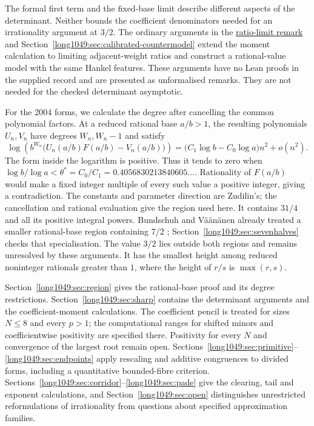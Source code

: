 \documentclass[11pt]{article}
\begin{document}
The formal first term and the fixed-base limit describe different
aspects of the determinant. Neither bounds the coefficient
denominators needed for an irrationality argument at $3/2$. The ordinary arguments in
the \hyperref[long1049:thm:geometric-ratio]{ratio-limit remark} and
Section~\ref{long1049:sec:calibrated-countermodel} extend the moment
calculation to limiting adjacent-weight ratios and construct a
rational-value model with the same Hankel features. These arguments
have no Lean proofs in the supplied record and are presented as
unformalised remarks. They are not needed for the checked determinant
asymptotic.

For the 2004 forms, we calculate the degree after cancelling the
common polynomial factors. At a reduced rational base $a/b>1$,
the resulting polynomials $U_n,V_n$ have degrees $W_n,W_n-1$ and
satisfy
\[
 \log\!\left(b^{W_n}\bigl(U_n(a/b)F(a/b)-V_n(a/b)\bigr)\right)
 =\bigl(C_1\log b-C_0\log a\bigr)n^2+o(n^2).
\]
The form inside the logarithm is positive. Thus it tends to zero
when $\log b/\log a<\theta^*=C_0/C_1
=0.4056830213840605\ldots$. Rationality of $F(a/b)$ would make a
fixed integer multiple of every such value a positive integer,
giving a contradiction. The constants and parameter direction are
Zudilin's; the cancellation and rational evaluation give the region
used here. It contains $31/4$ and all its positive integral powers.
Bundschuh and V\"a\"an\"anen already treated a smaller rational-base
region containing $7/2$ \cite[Theorem~2, p.~177]{bv1994};
Section~\ref{long1049:sec:sevenhalves} checks that specialisation.
The value $3/2$
lies outside both regions and remains unresolved by these arguments.
It has the smallest height among reduced noninteger rationals
greater than $1$, where the height of $r/s$ is $\max(r,s)$.

Section~\ref{long1049:sec:region} gives the rational-base proof and
its degree restrictions. Section~\ref{long1049:sec:sharp} contains
the determinant arguments and the coefficient-moment calculations.
The coefficient pencil is treated for sizes $N\le8$ and every
$p>1$; the computational ranges for shifted minors and coefficientwise
positivity are specified there. Positivity for every $N$ and
convergence of the largest root remain open.
Sections~\ref{long1049:sec:primitive}--\ref{long1049:sec:endpoints}
apply rescaling and additive congruences to divided forms, including
a quantitative bounded-fibre criterion.
Sections~\ref{long1049:sec:corridor}--\ref{long1049:sec:pade} give
the clearing, tail and exponent calculations, and
Section~\ref{long1049:sec:open} distinguishes unrestricted
reformulations of irrationality from questions about specified
approximation families.
\end{document}

